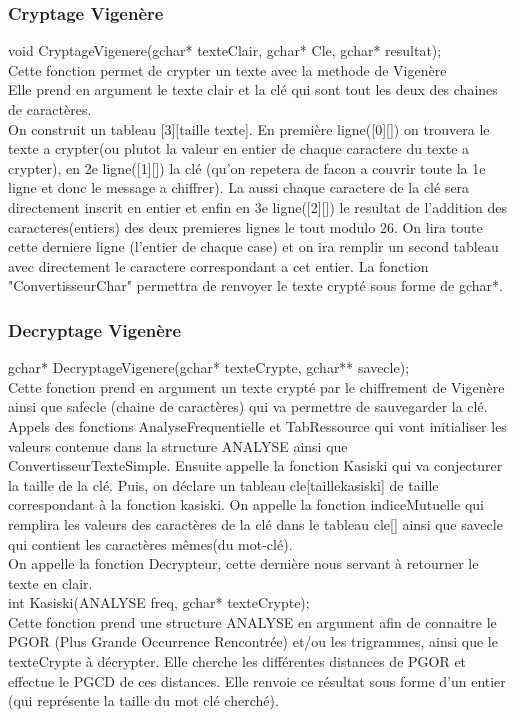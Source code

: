 \documentclass[a4]{article}
\begin{document}
	\subsubsection{Cryptage Vigenère}
	void CryptageVigenere(gchar* texteClair, gchar* Cle, gchar* resultat);\\
		Cette fonction permet de crypter un texte avec la methode de Vigenère\\
		Elle prend en argument le texte clair et la clé qui sont tout les deux des chaines de caractères.\\
		On construit un tableau [3][taille texte]. En première ligne([0][]) on trouvera le texte a crypter(ou plutot la valeur en entier de chaque caractere du texte a crypter), 
		en 2e ligne([1][]) la clé (qu'on repetera de facon a couvrir toute la 1e ligne et donc le message a chiffrer). La aussi chaque caractere de la clé sera directement inscrit en entier et enfin en 3e ligne([2][]) le resultat de l'addition des caracteres(entiers) des deux premieres lignes le tout modulo 26.
		On lira toute cette derniere ligne (l'entier de chaque case) et on ira remplir un second tableau avec directement le caractere correspondant a cet entier.
		La fonction "ConvertisseurChar" permettra de renvoyer le texte crypté sous forme de gchar*.
		
	\subsubsection{Decryptage Vigenère}
	gchar* DecryptageVigenere(gchar* texteCrypte, gchar** savecle);\\
		Cette fonction prend en argument un texte crypté par le chiffrement de Vigenère ainsi 
		que safecle (chaine de caractères) qui va permettre de sauvegarder la clé.
		Appels des fonctions AnalyseFrequentielle et TabRessource qui vont initialiser les valeurs 
		contenue dans la structure ANALYSE ainsi que ConvertisseurTexteSimple.
		Ensuite appelle la fonction Kasiski qui va conjecturer la taille de la clé.
		Puis, on déclare un tableau cle[taillekasiski] de taille correspondant à la fonction kasiski. 
		On appelle la fonction indiceMutuelle qui remplira les valeurs des caractères de la clé dans le tableau cle[]
		ainsi que savecle qui contient les caractères mêmes(du mot-clé).\\
		On appelle la fonction Decrypteur, cette dernière nous servant à retourner le texte en clair.\\
	
	int Kasiski(ANALYSE freq, gchar* texteCrypte);\\
		Cette fonction prend une structure ANALYSE en argument afin de connaitre le 
		PGOR (Plus Grande Occurrence Rencontrée) et/ou les trigrammes, ainsi que le texteCrypte à décrypter.
		Elle cherche les différentes distances de PGOR et effectue le PGCD de ces distances.
		Elle renvoie ce résultat sous forme d'un entier (qui représente la taille du mot clé cherché).\\
	
\end{document}
